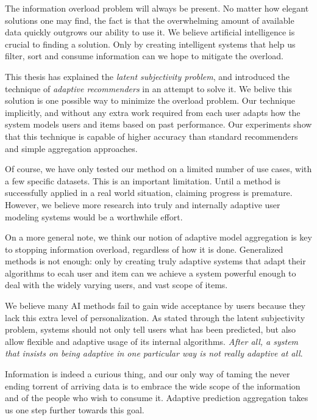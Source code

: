 The information overload problem will always be present.
No matter how elegant solutions one may find,
the fact is that the overwhelming amount of available data
quickly outgrows our ability to use it.
We believe artificial intelligence is crucial to finding a solution.
Only by creating intelligent systems that 
help us filter, sort and consume information can we hope 
to mitigate the overload.

This thesis has explained the \emph{latent subjectivity problem},
and introduced the technique of \emph{adaptive recommenders}
in an attempt to solve it.
We belive this solution is one possible way to minimize the overload problem.
Our technique implicitly, and without any extra work required from each user
adapts how the system models users and items based on past performance.
Our experiments show that this technique is capable of higher accuracy
than standard recommenders and simple aggregation approaches.

Of course, we have only tested our method on a limited 
number of use cases, with a few specific datasets.
This is an important limitation.
Until a method is successfully applied in a real world
situation, claiming progress is premature.
However, we believe more research into 
truly and internally adaptive user modeling systems
would be a worthwhile effort.

On a more general note, we think our notion of adaptive model
aggregation is key to stopping information overload,
regardless of how it is done.
Generalized methods is not enough: only
by creating truly adaptive systems that adapt their
algorithms to ecah user and item can we achieve a 
system powerful enough to deal with the widely
varying users, and vast scope of items.

We believe many AI methods fail to gain wide acceptance by users
because they lack this extra level of personalization.
As stated through the latent subjectivity problem,
systems should not only tell users what has been predicted,
but also allow flexible and adaptive usage of its internal algorithms.
\emph{After all, a system that insists on being adaptive
in one particular way is not really adaptive at all}.

\hr

\noindent
Information is indeed a curious thing,
and our only way of taming the never ending torrent of 
arriving data is to embrace the wide scope of the information
and of the people who wish to consume it.
Adaptive prediction aggregation takes us one step further towards this goal.

